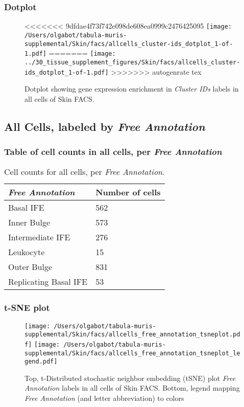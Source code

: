 \clearpage

\subsubsection{Dotplot}
\begin{figure}[h]
\centering
<<<<<<< 9dfdae4f73f742e098de608ea0999c2476425095
\texttt{[image: /Users/olgabot/tabula-muris-supplemental/Skin/facs/allcells\_cluster-ids\_dotplot\_1-of-1.pdf]}
=======
\texttt{[image: ../30\_tissue\_supplement\_figures/Skin/facs/allcells\_cluster-ids\_dotplot\_1-of-1.pdf]}
>>>>>>> autogenrate tex

\caption{ Dotplot  showing gene expression enrichment in \emph{Cluster IDs} labels in all cells of Skin FACS. }
\end{figure}


\clearpage

\subsection{All Cells, labeled by \emph{Free Annotation}}
\subsubsection{Table of cell counts in all cells, per \emph{Free Annotation}}\begin{table}[h]
\centering
\label{my-label}
\begin{tabular}{@{}ll@{}}
\toprule

\emph{Free Annotation}& Number of cells \\ \midrule
Basal IFE & 562 \\

Inner Bulge & 573 \\

Intermediate IFE & 276 \\

Leukocyte & 15 \\

Outer Bulge & 831 \\

Replicating Basal IFE & 53 \\
\bottomrule
\end{tabular}
\caption{Cell counts for all cells, per \emph{Free Annotation}.}
\end{table}

\clearpage
\subsubsection{t-SNE plot}
\begin{figure}[h]
\centering
\texttt{[image: /Users/olgabot/tabula-muris-supplemental/Skin/facs/allcells\_free\_annotation\_tsneplot.pdf]}
\texttt{[image: /Users/olgabot/tabula-muris-supplemental/Skin/facs/allcells\_free\_annotation\_tsneplot\_legend.pdf]}
\caption{Top, t-Distributed stochastic neighbor embedding (tSNE) plot  \emph{Free Annotation} labels in all cells of Skin FACS. Bottom, legend mapping \emph{Free Annotation} (and letter abbreviation) to colors}
\end{figure}


